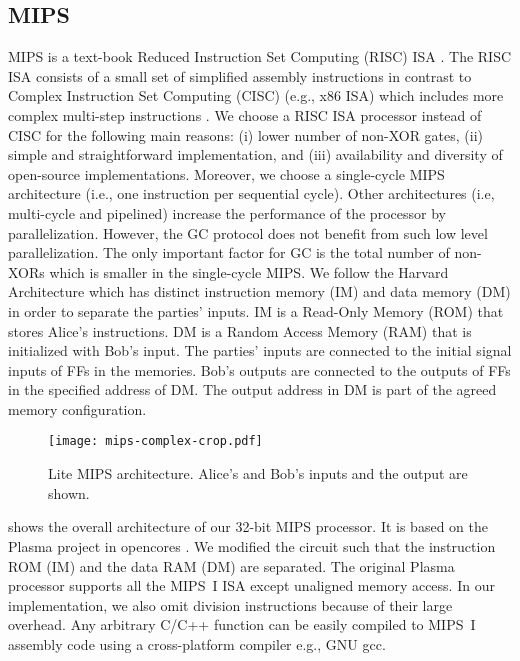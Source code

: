 \subsection{MIPS}\label{ssec:processor-mips}
MIPS is a text-book Reduced Instruction Set Computing (RISC) ISA \cite{kane1992mips}.
The RISC ISA consists of a small set of simplified assembly instructions in contrast to Complex Instruction Set Computing (CISC) (e.g., x86 ISA) which includes more complex multi-step instructions \cite{hennessy2012computer}.
We choose a RISC ISA processor instead of CISC for the following main reasons: (i) lower number of non-XOR gates, (ii) simple and straightforward implementation, and (iii) availability and diversity of open-source implementations.
Moreover, we choose a single-cycle MIPS architecture (i.e., one instruction per sequential cycle).
Other architectures (i.e, multi-cycle and pipelined) increase the performance of the processor by parallelization.
However, the GC protocol does not benefit from such low level parallelization.
The only important factor for GC is the total number of non-XORs which is smaller in the single-cycle MIPS.
We follow the Harvard Architecture which has distinct instruction memory (IM) and data memory (DM) in order to separate the parties' inputs.
IM is a Read-Only Memory (ROM) that stores Alice's instructions.
DM is a Random Access Memory (RAM) that is initialized with Bob's input.
The parties' inputs are connected to the initial signal inputs of FFs in the memories.
Bob's outputs are connected to the outputs of FFs in the specified address of DM.
The output address in DM is part of the agreed memory configuration.

\begin{figure}[ht]
\centering
\texttt{[image: mips-complex-crop.pdf]}
\caption{Lite MIPS architecture.
  Alice's and Bob's inputs and the output are shown.}\label{figure:mips}
\end{figure}

 shows the overall architecture of our 32-bit MIPS processor.
It is based on the Plasma project in opencores \cite{rhoads2006plasma}.
We modified the circuit such that the instruction ROM (IM) and the data RAM (DM) are separated.
The original Plasma processor supports all the MIPS~I ISA except unaligned memory access.
In our implementation, we also omit division instructions because of their large overhead.
Any arbitrary C/C++ function can be easily compiled to MIPS~I assembly code using a cross-platform compiler e.g., GNU gcc.

